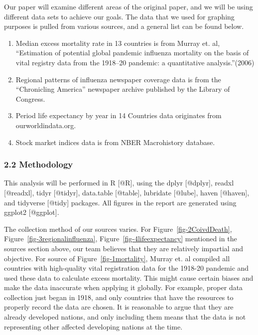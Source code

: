 \documentclass[
]{article}
\begin{document}
Our paper will examine different areas of the original paper, and we
will be using different data sets to achieve our goals. The data that we
used for graphing purposes is pulled from various sources, and a general
list can be found below.

\begin{enumerate}
\def\labelenumi{\arabic{enumi})}
\item
  Median excess mortality rate in 13 countries is from Murray et. al,
  ``Estimation of potential global pandemic influenza mortality on the
  basis of vital registry data from the 1918--20 pandemic: a
  quantitative analysis.''(2006)
\item
  Regional patterns of influenza newspaper coverage data is from the
  ``Chronicling America'' newspaper archive published by the Library of
  Congress.
\item
  Period life expectancy by year in 14 Countries data originates from
  ourworldindata.org.
\item
  Stock market indices data is from NBER Macrohistory database.
\end{enumerate}

\hypertarget{methodology}{%
\subsubsection{2.2 Methodology}\label{methodology}}

This analysis will be performed in R {[}@R{]}, using the dplyr
{[}@dplyr{]}, readxl {[}@readxl{]}, tidyr {[}@tidyr{]}, data.table
{[}@table{]}, lubridate {[}@lube{]}, haven {[}@haven{]}, and tidyverse
{[}@tidy{]} packages. All figures in the report are generated using
ggplot2 {[}@ggplot{]}.

The collection method of our sources varies. For
Figure~\ref{fig-2CoivdDeath}, Figure~\ref{fig-3regionalinfluenza},
Figure~\ref{fig-4lifeexpectancy} mentioned in the sources section above,
our team believes that they are relatively impartial and objective. For
source of Figure~\ref{fig-1mortality}, Murray et. al compiled all
countries with high-quality vital registration data for the 1918-20
pandemic and used these data to calculate excess mortality. This might
cause certain biases and make the data inaccurate when applying it
globally. For example, proper data collection just began in 1918, and
only countries that have the resources to properly record the data are
chosen. It is reasonable to argue that they are already developed
nations, and only including them means that the data is not representing
other affected developing nations at the time.
\end{document}
